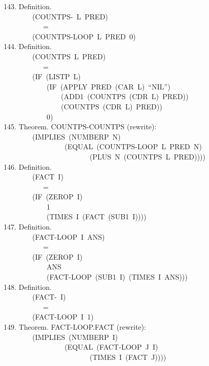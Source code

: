 \documentclass[10pt]{book}
\newenvironment{pubasis}{\begin{flushleft}}{\end{flushleft}}
\begin{document}
\begin{pubasis}
143.    Definition.\\
~~~~~~~~(COUNTPS-~L~PRED)\\
~~~~~~~~~~~=\\
~~~~~~~~(COUNTPS-LOOP~L~PRED~0)\\

144.    Definition.\\
~~~~~~~~(COUNTPS~L~PRED)\\
~~~~~~~~~~~=\\
~~~~~~~~(IF~(LISTP~L)\\
~~~~~~~~~~~~(IF~(APPLY~PRED~(CAR~L)~``NIL'')\\
~~~~~~~~~~~~~~~~(ADD1~(COUNTPS~(CDR~L)~PRED))\\
~~~~~~~~~~~~~~~~(COUNTPS~(CDR~L)~PRED))\\
~~~~~~~~~~~~0)\\

145.    Theorem.  COUNTPS-COUNTPS (rewrite):\\
~~~~~~~~(IMPLIES~(NUMBERP~N)\\
~~~~~~~~~~~~~~~~~(EQUAL~(COUNTPS-LOOP~L~PRED~N)\\
~~~~~~~~~~~~~~~~~~~~~~~~(PLUS~N~(COUNTPS~L~PRED))))\\

146.    Definition.\\
~~~~~~~~(FACT~I)\\
~~~~~~~~~~~=\\
~~~~~~~~(IF~(ZEROP~I)\\
~~~~~~~~~~~~1\\
~~~~~~~~~~~~(TIMES~I~(FACT~(SUB1~I))))\\

147.    Definition.\\
~~~~~~~~(FACT-LOOP~I~ANS)\\
~~~~~~~~~~~=\\
~~~~~~~~(IF~(ZEROP~I)\\
~~~~~~~~~~~~ANS\\
~~~~~~~~~~~~(FACT-LOOP~(SUB1~I)~(TIMES~I~ANS)))\\

148.    Definition.\\
~~~~~~~~(FACT-~I)\\
~~~~~~~~~~~=\\
~~~~~~~~(FACT-LOOP~I~1)\\

149.    Theorem.  FACT-LOOP.FACT (rewrite):\\
~~~~~~~~(IMPLIES~(NUMBERP~I)\\
~~~~~~~~~~~~~~~~~(EQUAL~(FACT-LOOP~J~I)\\
~~~~~~~~~~~~~~~~~~~~~~~~(TIMES~I~(FACT~J))))\\


\end{pubasis}
\end{document}

